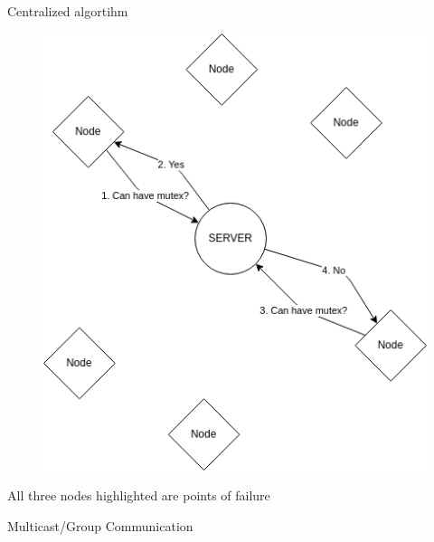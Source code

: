 \documentclass[aspectratio=1610,17pt,utf8]{beamer}
\begin{document}
\begin{frame}{Centralized algortihm}
    \begin{minipage}{.45\textwidth}
        \begin{figure}
            \includegraphics[width=\textwidth]{figures/mutex.png}
        \end{figure}
    \end{minipage}
    \begin{minipage}{.5\textwidth}
        \tiny{All three nodes highlighted are points of failure}
    \end{minipage}
\end{frame}


\begin{frame}{Multicast/Group Communication}
\end{frame}

\end{document}
